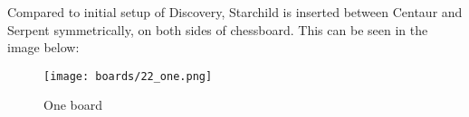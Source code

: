 Compared to initial setup of Discovery, Starchild is inserted between Centaur and
Serpent symmetrically, on both sides of chessboard. This can be seen in the image
below:

\noindent
\begin{figure}[h]
\texttt{[image: boards/22\_one.png]}
\caption{One board}
\label{fig:22_one}
\end{figure}

\clearpage %
